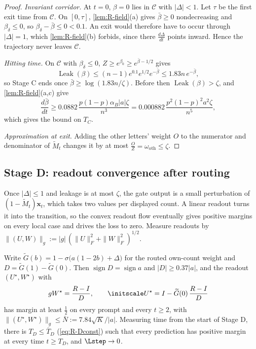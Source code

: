 \begin{proof}
\emph{Invariant corridor.} At $t=0$, $\beta=0$ lies in $\mathcal C$ with $|\Delta|<1$. Let $\tau$ be the first exit time from $\mathcal C$. On
$[0,\tau]$, \cref{lem:R-field}(a) gives $\bar\beta\ge0$ nondecreasing and $\beta_\delta\le0$, so $\beta_\delta-\bar\beta\le0<0.1$. An exit would
therefore have to occur through $|\Delta|=1$, which \cref{lem:R-field}(b) forbids, since there $\tfrac{d\Delta}{dt}$ points inward. Hence the
trajectory never leaves $\mathcal C$.

\emph{Hitting time.} On $\mathcal C$ with $\beta_\delta\le0$, $Z\ge e^{\beta_0}\ge e^{\bar\beta-1/2}$ gives
\[
 \operatorname{Leak}(\beta)\le(n-1)e^{0.1}e^{1/2}e^{-\bar\beta}\le1.83n\,e^{-\bar\beta},
\]
so Stage C ends once $\bar\beta\ge\log(1.83n/\zeta)$. Before then $\operatorname{Leak}(\beta)>\zeta$, and \cref{lem:R-field}(a,c) give
\[
 \frac{d\bar\beta}{dt}\ge0.0882\,\frac{p(1-p)\alpha_B|a|\zeta}{n^3}=0.000882\,\frac{p^2(1-p)^2a^2\zeta}{n^5},
\]
which gives the bound on $T_C$.

\emph{Approximation at exit.} Adding the other letters' weight $O$ to the numerator and denominator of $\widetilde M_t$ changes it by
at most $\tfrac OZ=\omega_{\mathrm{oth}}\le\zeta$.
\end{proof}

\subsection{Stage D: readout convergence after routing}
Once $|\Delta|\le1$ and leakage is at most $\zeta$, the gate output is a small perturbation of $(1-\widetilde M_t)\bm x_t$, which takes
two values per displayed count. A linear readout turns it into the transition, so the convex readout flow eventually gives
positive margins on every local case and drives the loss to zero. Measure readouts by $\|(U,W)\|_g:=|g|\,(\|U\|_F^2+\|W\|_F^2)^{1/2}$.

\begin{lemma}[Stage D]
\label{lem:R-D}
Write $\widetilde G(b)=1-\sigma\bigl(a(1-2b)+\Delta\bigr)$ for the routed own-count weight and $D=\widetilde G(1)-\widetilde G(0)$. Then
$\operatorname{sign}D=\operatorname{sign}a$ and $|D|\ge0.37|a|$, and the readout $(U^\star,W^\star)$ with
\[
 gW^\star=\frac{R-I}D,\qquad \initscale U^\star=I-\widetilde G(0)\,\frac{R-I}D
\]
has margin at least $\tfrac12$ on every prompt and every $t\ge2$, with $\|(U^\star,W^\star)\|_g\le\bar N:=7.84\sqrt K/|a|$. Measuring time from
the start of Stage D, there is $T_D\le\overline T_D$ (\cref{eq:R-Dconst}) such that every prediction has positive margin at every time
$t\ge T_D$, and $\Lstep\to0$.
\end{lemma}

